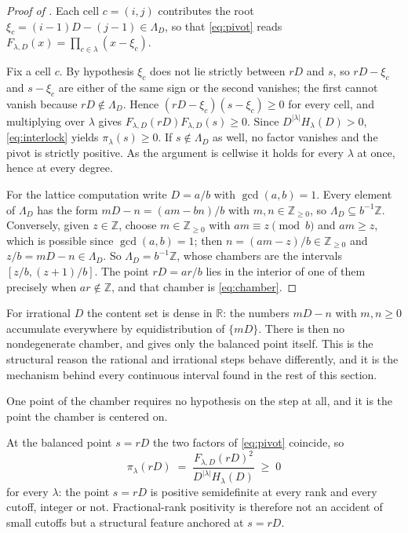 \documentclass[11pt,letterpaper]{article}
\newcommand{\Zint}{\mathbb{Z}}
\newcommand{\Rr}{\mathbb{R}}
\begin{document}
\begin{proof}[Proof of ]
Each cell $c=(i,j)$ contributes the root $\xi_c=(i-1)D-(j-1)\in\Lambda_D$, so
that \eqref{eq:pivot} reads $F_{\lambda,D}(x)=\prod_{c\in\lambda}(x-\xi_c)$.

Fix a cell $c$. By hypothesis $\xi_c$ does not lie strictly between $rD$ and $s$,
so $rD-\xi_c$ and $s-\xi_c$ are either of the same sign or the second vanishes;
the first cannot vanish because $rD\notin\Lambda_D$. Hence
$(rD-\xi_c)(s-\xi_c)\ge0$ for every cell, and multiplying over $\lambda$ gives
$F_{\lambda,D}(rD)F_{\lambda,D}(s)\ge0$. Since $D^{|\lambda|}H_\lambda(D)>0$,
\eqref{eq:interlock} yields $\pi_\lambda(s)\ge0$. If $s\notin\Lambda_D$ as well,
no factor vanishes and the pivot is strictly positive. As the argument is
cellwise it holds for every $\lambda$ at once, hence at every degree.

For the lattice computation write $D=a/b$ with $\gcd(a,b)=1$. Every element of
$\Lambda_D$ has the form $mD-n=(am-bn)/b$ with $m,n\in\Zint_{\ge0}$, so
$\Lambda_D\subseteq b^{-1}\Zint$. Conversely, given $z\in\Zint$, choose
$m\in\Zint_{\ge0}$ with $am\equiv z\pmod b$ and $am\ge z$, which is possible
since $\gcd(a,b)=1$; then $n=(am-z)/b\in\Zint_{\ge0}$ and $z/b=mD-n\in\Lambda_D$.
So $\Lambda_D=b^{-1}\Zint$, whose chambers are the intervals $[z/b,(z+1)/b]$. The
point $rD=ar/b$ lies in the interior of one of them precisely when
$ar\notin\Zint$, and that chamber is \eqref{eq:chamber}.
\end{proof}

For irrational $D$ the content set is dense in $\Rr$: the numbers $mD-n$ with
$m,n\ge0$ accumulate everywhere by equidistribution of $\{mD\}$. There is then no
nondegenerate chamber, and  gives only the balanced point
itself. This is the structural reason the rational and irrational steps behave
differently, and it is the mechanism behind every continuous interval found in
the rest of this section.

One point of the chamber requires no hypothesis on the step at all, and it is
the point the chamber is centered on.

At the balanced point $s=rD$
the two factors of \eqref{eq:pivot} coincide, so
\begin{equation}
  \pi_\lambda(rD)\;=\;\frac{F_{\lambda,D}(rD)^{2}}{D^{|\lambda|}H_\lambda(D)}\;\ge\;0
  \label{eq:balanced}
\end{equation}
for every $\lambda$: the point $s=rD$ is positive semidefinite at every rank and
every cutoff, integer or not. Fractional-rank positivity is therefore not an
accident of small cutoffs but a structural feature anchored at $s=rD$.
\end{document}
